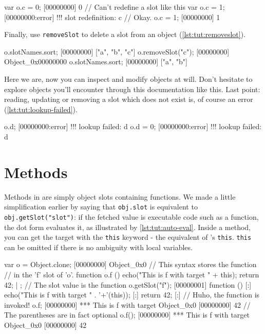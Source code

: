 \begin{urbiscript}[caption=Defining a slot twice is an error,
  label=lst:tut:redefinition, name=object-slots]
var o.c = 0;
[00000000] 0
// Can't redefine a slot like this
var o.c = 1;
[00000000:error] !!! slot redefinition: c
// Okay.
o.c = 1;
[00000000] 1
\end{urbiscript}

Finally, use \lstinline{removeSlot} to delete a slot from an object
(\autoref{lst:tut:removeslot}).

\begin{urbiscript}[caption=Removing a slot, label=lst:tut:removeslot,
  name=object-slots]
o.slotNames.sort;
[00000000] ["a", "b", "c"]
o.removeSlot("c");
[00000000] Object_0x00000000
o.slotNames.sort;
[00000000] ["a", "b"]
\end{urbiscript}

Here we are, now you can inspect and modify objects at will. Don't
hesitate to explore \us objects you'll encounter through this
documentation like this. Last point: reading, updating or removing a
slot which does not exist is, of course an error
(\autoref{lst:tut:lookup-failed}).

\begin{urbiscript}[caption=Manipulating nonexistent slot is an error,
  label=lst:tut:lookup-failed, name=object-slots]
o.d;
[00000000:error] !!! lookup failed: d
o.d = 0;
[00000000:error] !!! lookup failed: d
\end{urbiscript}

\section{Methods}

Methods in \us are simply object slots containing functions. We made
a little simplification earlier by saying that \lstinline|obj.slot| is
equivalent to \lstinline|obj.getSlot("slot")|: if the fetched value is
executable code such as a function, the dot form evaluates it, as
illustrated by \autoref{lst:tut:auto-eval}. Inside a method, you can get the
target with the \lstinline|this| keyword - the equivalent of \Cxx's
\lstinline{this}. \lstinline|this| can be omitted if there is no
ambiguity with local variables.

\begin{urbiscript}[caption=Function in object are automatically evaluated,
label=lst:tut:auto-eval]
var o = Object.clone;
[00000000] Object_0x0
// This syntax stores the function
// in the 'f' slot of 'o'.
function o.f ()
{
  echo("This is f with target " + this);
  return 42;
} | {};
// The slot value is the function
o.getSlot("f");
[00000001] function () {
[:]  echo("This is f with target " . '+'(this));
[:]  return 42;
[:]}
// Huho, the function is invoked!
o.f;
[00000000] *** This is f with target Object_0x0
[00000000] 42
// The parentheses are in fact optional
o.f();
[00000000] *** This is f with target Object_0x0
[00000000] 42
\end{urbiscript}

